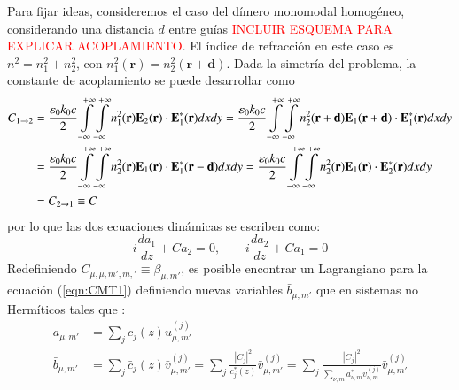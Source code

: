 Para fijar ideas, consideremos el caso del dímero monomodal homogéneo, considerando una distancia $d$ entre guías \textcolor{red}{INCLUIR ESQUEMA PARA EXPLICAR ACOPLAMIENTO}. El índice de refracción en este caso es $n^2 = n_1^2 + n_2^2$, con $n_1^2(\textbf{r})=n_2^2(\textbf{r}+\textbf{d})$. Dada la simetría del problema, la constante de acoplamiento se puede desarrollar como 
\begin{align}
	C_{1 \to 2} &=  \frac{\epsilon_0 k_0 c}{2}\int\displaylimits_{-\infty}^{+\infty}\int\displaylimits_{-\infty}^{+\infty}  n_1^2(\textbf{r}) \textbf{E}_{2}(\textbf{r}) \cdot \textbf{E}_{1}^*(\textbf{r}) dxdy 
	=\frac{\epsilon_0 k_0 c}{2}\int\displaylimits_{-\infty}^{+\infty}\int\displaylimits_{-\infty}^{+\infty}  n_2^2(\textbf{r}+\textbf{d}) \textbf{E}_{1}(\textbf{r}+\textbf{d}) \cdot \textbf{E}_{1}^*(\textbf{r}) dxdy 
	\nonumber	
	\\	
	&= \frac{\epsilon_0 k_0 c}{2}\int\displaylimits_{-\infty}^{+\infty}\int\displaylimits_{-\infty}^{+\infty} n_2^2(\textbf{r}) \textbf{E}_{1}(\textbf{r}) \cdot \textbf{E}_{1}^*(\textbf{r}-\textbf{d}) dxdy 
	= \frac{\epsilon_0 k_0 c}{2}\int\displaylimits_{-\infty}^{+\infty}\int\displaylimits_{-\infty}^{+\infty} n_2^2(\textbf{r}) \textbf{E}_{1}(\textbf{r}) \cdot \textbf{E}_{2}^*(\textbf{r}) dxdy 
	\nonumber
	\\	
	&= C_{2\to1} \equiv C
	\nonumber
\end{align}
 por lo que las dos ecuaciones dinámicas se escriben como:
\begin{equation}
	i\frac{d a_1}{dz} + C a_2 = 0, \quad\quad i\frac{d a_2}{dz} + C a_1 = 0 \nonumber
\end{equation}
Redefiniendo $C_{\mu, \mu, m', m,'} \equiv \beta_{\mu, m'}$, es posible encontrar un Lagrangiano para la ecuación (\ref{eqn:CMT1}) definiendo nuevas variables $\bar{b}_{\mu, m'}$ que en sistemas no Hermíticos tales que \cite{NHHamiltonian}:
\begin{align*}
	a_{\mu, m'} &= \sum_j c_j(z) u^{(j)}_{\mu, m'}
	\\
	\bar{b}_{\mu, m'} &= \sum_j \bar{c}_j(z) \bar{v}^{(j)}_{\mu, m'} = \sum_j \frac{|C_j|^2}{c_j^*(z)} \bar{v}^{(j)}_{\mu, m'} = \sum_j \frac{|C_j|^2}{\sum_{\nu, m} a^*_{\nu, m} \bar{v}^{(j)}_{\nu, m}} \bar{v}^{(j)}_{\mu, m'}
\end{align*}


